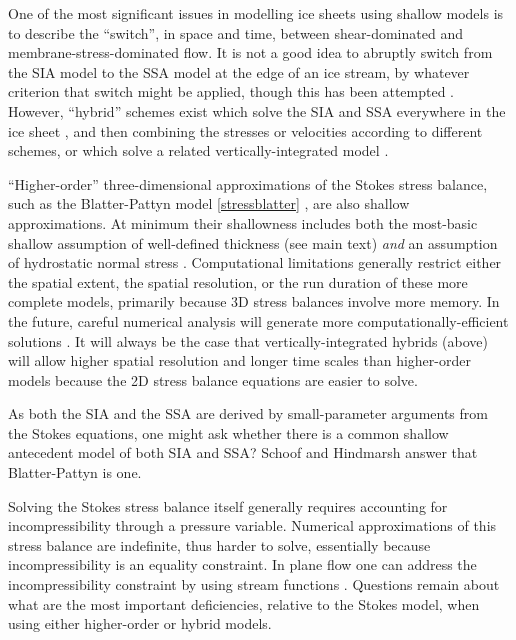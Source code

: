 \documentclass[letterpaper,final,12pt,reqno]{amsart}
\begin{document}
One of the most significant issues in modelling ice sheets using shallow models is to describe the ``switch'', in space and time, between shear-dominated and membrane-stress-dominated flow.  It is not a good idea to abruptly switch from the SIA model to the SSA model at the edge of an ice stream, by whatever criterion that switch might be applied, though this has been attempted \cite{HulbeMacAyeal,Ritzetal2001}.  However, ``hybrid'' schemes exist which solve the SIA and SSA everywhere in the ice sheet \cite{BBssasliding,Winkelmannetal2011}, and then combining the stresses or velocities according to different schemes, or which solve a related vertically-integrated model \cite{BrinkerhoffJohnson2013,Goldberg2011,PollardDeConto}.

``Higher-order'' three-dimensional approximations of the Stokes stress balance, such as the Blatter-Pattyn model \eqref{stressblatter} \cite{Blatter,Pattyn03}, are also shallow approximations.  At minimum their shallowness includes both the most-basic shallow assumption of well-defined thickness (see main text) \emph{and} an assumption of hydrostatic normal stress \cite{GreveBlatter2009}.  Computational limitations generally restrict either the spatial extent, the spatial resolution, or the run duration of these more complete models, primarily because 3D stress balances involve more memory.  In the future, careful numerical analysis will generate more computationally-efficient solutions \cite{Brown2013}.  It will always be the case that vertically-integrated hybrids (above) will allow higher spatial resolution and longer time scales than higher-order models because the 2D stress balance equations are easier to solve.

As both the SIA and the SSA are derived by small-parameter arguments from the Stokes equations, one might ask whether there is a common shallow antecedent model of both SIA and SSA?  Schoof and Hindmarsh \cite{SchoofHindmarsh} answer that Blatter-Pattyn is one.

Solving the Stokes stress balance itself \cite{JouvetRappaz2011,Lengetal2012,ISMIPHOM} generally requires accounting for incompressibility through a pressure variable.  Numerical approximations of this stress balance are indefinite, thus harder to solve, essentially because incompressibility is an equality constraint.  In plane flow one can address the incompressibility constraint by using stream functions \cite{BaliseRaymond1985}.  Questions remain about what are the most important deficiencies, relative to the Stokes model, when using either higher-order \cite{ISMIPHOM} or hybrid models.
\end{document}
